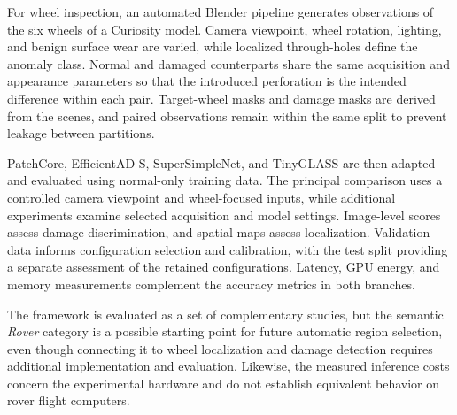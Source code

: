 For wheel inspection, an automated Blender pipeline generates observations of the six wheels of a Curiosity model. Camera viewpoint, wheel rotation, lighting, and benign surface wear are varied, while localized through-holes define the anomaly class. Normal and damaged counterparts share the same acquisition and appearance parameters so that the introduced perforation is the intended difference within each pair. Target-wheel masks and damage masks are derived from the scenes, and paired observations remain within the same split to prevent leakage between partitions.

PatchCore, EfficientAD-S, SuperSimpleNet, and TinyGLASS are then adapted and evaluated using normal-only training data. The principal comparison uses a controlled camera viewpoint and wheel-focused inputs, while additional experiments examine selected acquisition and model settings. Image-level scores assess damage discrimination, and spatial maps assess localization. Validation data informs configuration selection and calibration, with the test split providing a separate assessment of the retained configurations. Latency, GPU energy, and memory measurements complement the accuracy metrics in both branches.


The framework is evaluated as a set of complementary studies, but the semantic \emph{Rover} category is a possible starting point for future automatic region selection, even though connecting it to wheel localization and damage detection requires additional implementation and evaluation. Likewise, the measured inference costs concern the experimental hardware and do not establish equivalent behavior on rover flight computers.

